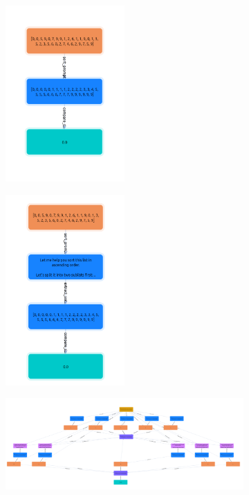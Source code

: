 \documentclass{article}
\begin{document}
\begin{figure}[h]
    \centering
    \begin{subfigure}{0.15\textwidth}
        \centering
        \includegraphics[width=0.5\textwidth]{images/io.png}
    \end{subfigure}%
    \begin{subfigure}{0.15\textwidth}
        \centering
        \includegraphics[width=0.5\textwidth]{images/chain_of_thoughts.png}
    \end{subfigure}%
    \begin{subfigure}{0.7\textwidth}
        \centering
        \includegraphics[width=1.0\textwidth]{images/tree_of_thoughts.png}

\end{subfigure}
\end{figure}
\end{document}
